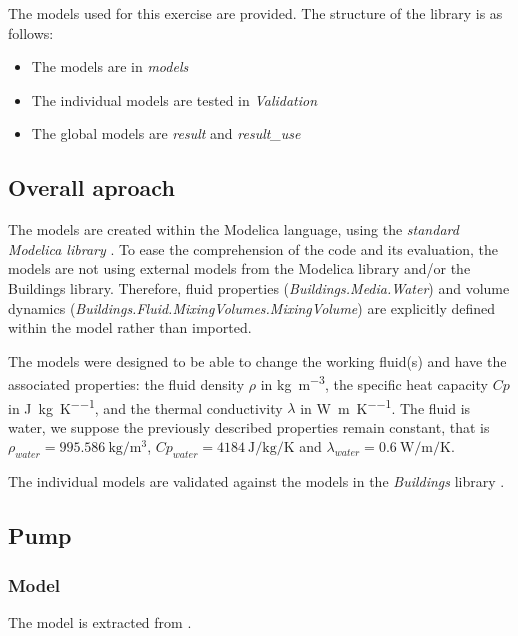 \documentclass[letterpaper,11pt]{article}
\begin{document}
The models used for this exercise are provided. The structure of the library is as follows:
\begin{itemize}[noitemsep,topsep=0pt]
	\item The models are in \textit{models}
	\item The individual models are tested in \textit{Validation}
	\item The global models are \textit{result} and \textit{result\_use}
\end{itemize}

\subsection{Overall aproach}

The models are created within the Modelica language, using the \textit{standard Modelica library} \parencite{modelicalib}. 
To ease the comprehension of the code and its evaluation, the models are not using external models from the Modelica library and/or the Buildings library. Therefore, fluid properties (\textit{Buildings.Media.Water}) and volume dynamics (\textit{Buildings.Fluid.MixingVolumes.MixingVolume}) are explicitly defined within the model rather than imported.

The models were designed to be able to change the working fluid(s) and have the associated properties: the fluid density $\rho$ in \unit{\kilogram\per\cubic\meter}, the specific heat capacity $Cp$ in \unit{\joule\per\kilogram\per\kelvin}, and the thermal conductivity $\lambda$ in \unit{\watt\per\meter\per\kelvin}. 
The fluid is water, we suppose the previously described properties remain constant, that is $\rho_{water}=\qty{995.586}{\kilogram\per\cubic\meter}$, $Cp_{water} = \qty{4184}{\joule\per\kilogram\per\kelvin}$ and $\lambda_{water} = \qty{0.6}{\watt\per\meter\per\kelvin}$.

The individual models are validated against the models in the \textit{Buildings} library \parencite{WetterZuoNouiduiPang2014}.

\subsection{Pump}

\subsubsection{Model}

The model is extracted from \parencite{patur2023}.
\end{document}
